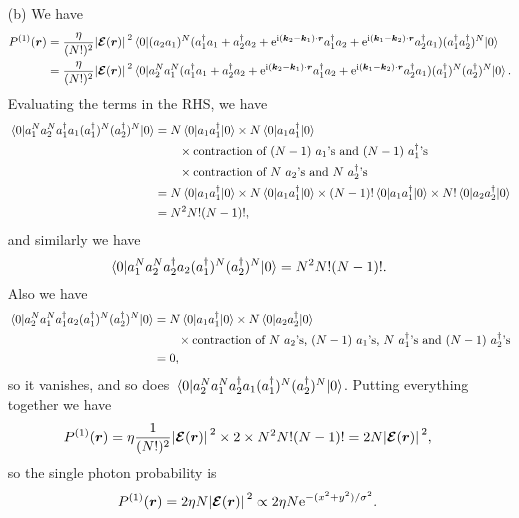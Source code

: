 \documentclass[hyperref, a4paper]{article}
\newcommand*{\ii}{\mathrm{i}}
\newcommand*{\ee}{\mathrm{e}}
\begin{document}
\begin{itemize}
\item[(b)] We have 
\[
    \begin{aligned}
        P^{(1)}(\vb*{r}) &= \frac{\eta}{(N!)^2} \abs*{\vb*{\mathcal{E}}(\vb*{r})}^2 \expval*{(a_2 a_1)^N (a_1^\dagger a_1 + a_2^\dagger a_2 + \ee^{\ii (\vb*{k}_2 - \vb*{k}_1) \cdot \vb*{r}} a_1^\dagger a_2 + \ee^{\ii (\vb*{k}_1 - \vb*{k}_2) \cdot \vb*{r}} a_2^\dagger a_1 ) (a_1^\dagger a_2^\dagger)^N}{0} \\
        &= \frac{\eta}{(N!)^2} \abs*{\vb*{\mathcal{E}}(\vb*{r})}^2 \expval*{a_2^N a_1^N (a_1^\dagger a_1 + a_2^\dagger a_2 + \ee^{\ii (\vb*{k}_2 - \vb*{k}_1) \cdot \vb*{r}} a_1^\dagger a_2 + \ee^{\ii (\vb*{k}_1 - \vb*{k}_2) \cdot \vb*{r}} a_2^\dagger a_1 ) (a_1^\dagger)^N (a_2^\dagger)^N}{0}.
    \end{aligned}
\] 
Evaluating the terms in the RHS, we have 
\[
    \begin{aligned}
        \expval*{a_1^N a_2^N a_1^\dagger a_1 (a_1^\dagger)^N (a_2^\dagger)^N}{0} 
        &= N \expval*{a_1 a_1^\dagger}{0} \times N \expval*{a_1 a_1^\dagger}{0} \\
        &\quad \quad \times \text{contraction of $(N-1)$ $a_1$'s and $(N-1)$ $a_1^\dagger$'s} \\
        &\quad \quad \times \text{contraction of $N$ $a_2$'s and $N$ $a_2^\dagger$'s} \\
        &= N \expval*{a_1 a_1^\dagger}{0} \times N \expval*{a_1 a_1^\dagger}{0} 
        \times (N-1)! \expval*{a_1 a_1^\dagger}{0} \times N! \expval*{a_2 a_2^\dagger}{0} \\
        &= N^2 N! (N-1)!,
    \end{aligned}
\]
and similarly we have 
\[
    \expval*{a_1^N a_2^N a_2^\dagger a_2 (a_1^\dagger)^N (a_2^\dagger)^N}{0} = N^2 N! (N-1)!.
\]
Also we have 
\[
    \begin{aligned}
        \expval*{a_2^N a_1^N a_1^\dagger a_2 (a_1^\dagger)^N (a_2^\dagger)^N}{0}
        &= N \expval*{a_1 a_1^\dagger}{0} \times N \expval*{a_2 a_2^\dagger}{0}  \\
        &\quad \quad \times \text{contraction of $N$ $a_2$'s, $(N-1)$ $a_1$'s, $N$ $a_1^\dagger$'s and $(N-1)$ $a^\dagger_2$'s} \\
        &= 0, 
    \end{aligned}
\]
so it vanishes, and so does $\expval*{a_2^N a_1^N a_2^\dagger a_1 (a_1^\dagger)^N (a_2^\dagger)^N}{0}$.
Putting everything together we have 
\[
    P^{(1)}(\vb*{r}) = \eta \frac{1}{(N!)^2} \abs*{\vb*{\mathcal{E}}(\vb*{r})}^2 \times 2 \times N^2 N! (N-1)! = 2 N \abs*{\vb*{\mathcal{E}}(\vb*{r})}^2,
\]
so the single photon probability is 
\begin{equation}
    P^{(1)}(\vb*{r}) = 2 \eta N \abs*{\vb*{\mathcal{E}}(\vb*{r})}^2 \propto 2 \eta N \ee^{- (x^2 + y^2) / \sigma^2}.
\end{equation}


\end{itemize}
\end{document}
